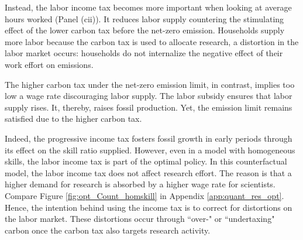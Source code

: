 Instead, the labor income tax becomes more important when looking at average hours worked (Panel (cii)). It reduces labor supply countering the stimulating effect of the lower carbon tax before the net-zero emission. Households supply more labor because the carbon tax is used to allocate research, a distortion in the labor market occurs: households do not internalize the negative effect of their work effort on emissions. 

The higher carbon tax under the net-zero emission limit, in contrast, implies too low a wage rate discouraging labor supply. The labor subsidy ensures that labor supply rises. It, thereby, raises fossil production. Yet, the emission limit remains satisfied due to the higher carbon tax. %

Indeed, the progressive income tax fosters fossil growth in early periods through its effect on the skill ratio supplied. However, even in a model with homogeneous skills, the labor income tax is part of the optimal policy. In this counterfactual model, the labor income tax does not affect research effort. The reason is that a higher demand for research is absorbed by a higher wage rate for scientists. Compare Figure \ref{fig:opt_Count_homskill} in Appendix \ref{app:quant_res_opt}.  Hence, the intention behind using the income tax is to correct for distortions on the labor market. These distortions occur through ``over-" or ``undertaxing" carbon once the carbon tax also targets research activity. 


